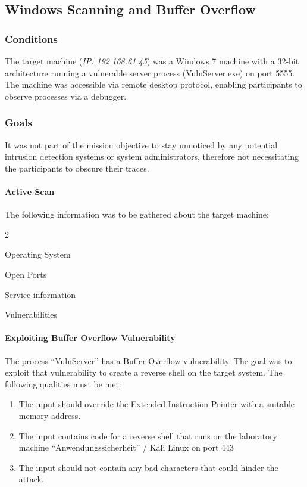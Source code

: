 \documentclass[../report.tex]{subfiles}
\begin{document}
\subsection{Windows Scanning and Buffer Overflow}
\subsubsection{Conditions}
The target machine (\textit{IP: 192.168.61.45}) was a Windows 7 machine with a 32-bit architecture running a vulnerable server process (VulnServer.exe) on port 5555. The machine was accessible via remote desktop protocol, enabling participants to observe processes via a debugger.

\subsubsection{Goals}
It was not part of the mission objective to stay unnoticed by any potential intrusion detection systems or system administrators, therefore not necessitating the participants to obscure their traces.
\paragraph{Active Scan}
The following information was to be gathered about the target machine:
\begin{itemize}
\begin{multicols}{2}
\item{Operating System}
\item{Open Ports}
\item{Service information}
\item{Vulnerabilities}
\end{multicols}
\end{itemize}

\paragraph{Exploiting Buffer Overflow Vulnerability}
The process \enquote{VulnServer} has a Buffer Overflow vulnerability.
The goal was to exploit that vulnerability to create a reverse shell on the target system.
The following qualities must be met:
\vspace{-3mm}
\begin{enumerate}
\item{The input should override the Extended Instruction Pointer with a suitable memory address.}
\item{The input contains code for a reverse shell that runs on the laboratory machine \enquote{Anwendungssicherheit} / Kali Linux on port 443}
\item{The input should not contain any bad characters that could hinder the attack.}
\end{enumerate}
\end{document}
